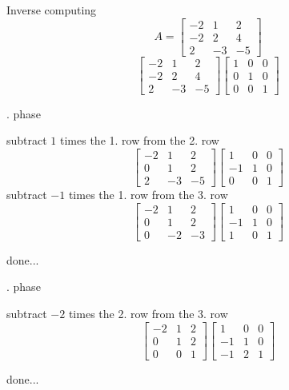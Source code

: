 \documentclass[12pt]{article}
\begin{document}
Inverse computing
$$ A=\left[{\begin{array}{ccc}-2& 1& 2\\ -2& 2& 4\\ 2& -3& -5\end{array}}\right]$$
$$\left[{\begin{array}{ccc}-2& 1& 2\\ -2& 2& 4\\ 2& -3& -5\end{array}}\right]\left[{\begin{array}{ccc}1& 0& 0\\ 0& 1& 0\\ 0& 0& 1\end{array}}\right]$$
\par{}. phase

subtract $1$ times the 1. row from the 2. row
$$\left[{\begin{array}{ccc}-2& 1& 2\\ 0& 1& 2\\ 2& -3& -5\end{array}}\right]\left[{\begin{array}{ccc}1& 0& 0\\ -1& 1& 0\\ 0& 0& 1\end{array}}\right]$$
subtract $-1$ times the 1. row from the 3. row
$$\left[{\begin{array}{ccc}-2& 1& 2\\ 0& 1& 2\\ 0& -2& -3\end{array}}\right]\left[{\begin{array}{ccc}1& 0& 0\\ -1& 1& 0\\ 1& 0& 1\end{array}}\right]$$
\par\noindent done...


\par{}. phase

subtract $-2$ times the 2. row from the 3. row
$$\left[{\begin{array}{ccc}-2& 1& 2\\ 0& 1& 2\\ 0& 0& 1\end{array}}\right]\left[{\begin{array}{ccc}1& 0& 0\\ -1& 1& 0\\ -1& 2& 1\end{array}}\right]$$
\par\noindent done...
\end{document}
